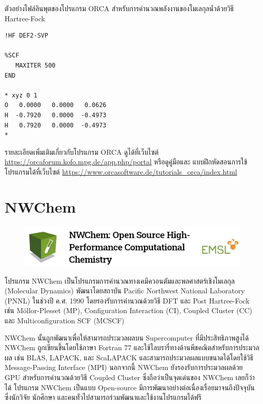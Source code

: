 ตัวอย่างไฟล์อินพุตของโปรแกรม ORCA สำหรับการคำนวณพลังงานของโมเลกุลน้ำด้วยวิธี Hartree-Fock

\begin{lstlisting}[style=plain]
!HF DEF2-SVP

%SCF
   MAXITER 500
END

* xyz 0 1
O   0.0000   0.0000   0.0626
H  -0.7920   0.0000  -0.4973
H   0.7920   0.0000  -0.4973
*
\end{lstlisting}

\vspace{1em}

รายละเอียดเพิ่มเติมเกี่ยวกับโปรแกรม ORCA ดูได้ที่เว็บไซต์ \url{https://orcaforum.kofo.mpg.de/app.php/portal} หรือดูคู่มือและ%
แบบฝึกหัดสอนการใช้โปรแกรมได้ที่เว็บไซต์ \url{https://www.orcasoftware.de/tutorials_orca/index.html}

\section{NWChem}
\label{sec:software_nwchem}

\begin{figure}[H]
    \centering
    \includegraphics[width=0.8\linewidth]{fig/logo_nwchem.png}
    \label{fig:logo_nwchem}
\end{figure}

โปรแกรม NWChem เป็นโปรแกรมการคำนวณทางเคมีควอนตัมและพลศาสตร์เชิงโมเลกุล (Molecular Dynamics)\autocite{apra2020} 
พัฒนาโดยสถาบัน Pacific Northwest National Laboratory (PNNL) ในช่วงปี ค.ศ. 1990 โดยรองรับการคำนวณด้วยวิธี DFT และ 
Post Hartree-Fock เช่น M\"{o}llor-Plesset (MP), Configuration Interaction (CI), Coupled Cluster (CC) และ
Multiconfiguration SCF (MCSCF) 

NWChem นั้นถูกพัฒนาเพื่อให้สามารถประมวลผลบน Supercomputer ที่มีประสิทธิภาพสูงได้ NWChem ถูกเขียนขึ้นโดยใช้ภาษา Fortran 77
และใช้ไลบรารี่ทางด้านพีชคณิตสำหรับการประมวลผล เช่น BLAS, LAPACK, และ ScaLAPACK และสามารถประมวลผลแบบขนาดได้โดยใช้วิธี 
Message-Passing Interface (MPI) นอกจากนี้ NWChem ยังรองรับการประมวลผลด้วย GPU สำหรับการคำนวณด้วยวิธี Coupled Cluster 
ซึ่งถือว่าเป็นจุดเด่นของ NWChem เลยก็ว่าได้ โปรแกรม NWChem เป็นแบบ Open-source มีการพัฒนาอย่างต่อเนื่องเรื่อยมาจนถึงปัจจุบัน ซึ่งนักวิจัย 
นักศึกษา และคนทั่วไปสามารถร่วมพัฒนาและใช้งานโปรแกรมได้ฟรี

